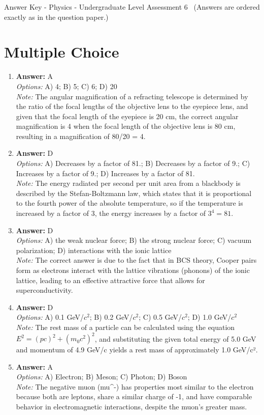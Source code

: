 \documentclass[12pt]{article}
\begin{document}
\begin{center}
Answer Key - Physics - Undergraduate Level Assessment 6 \
\small (Answers are ordered exactly as in the question paper.)
\end{center}

\section*{Multiple Choice}
\begin{enumerate}[label=\arabic*.]
\item \textbf{Answer:} A
\\ \textit{Options:} A) 4; B) 5; C) 6; D) 20
\\ \textit{Note:} The angular magnification of a refracting telescope is determined by the ratio of the focal lengths of the objective lens to the eyepiece lens, and given that the focal length of the eyepiece is 20 cm, the correct angular magnification is 4 when the focal length of the objective lens is 80 cm, resulting in a magnification of 80/20 = 4.
\item \textbf{Answer:} D
\\ \textit{Options:} A) Decreases by a factor of 81.; B) Decreases by a factor of 9.; C) Increases by a factor of 9.; D) Increases by a factor of 81.
\\ \textit{Note:} The energy radiated per second per unit area from a blackbody is described by the Stefan-Boltzmann law, which states that it is proportional to the fourth power of the absolute temperature, so if the temperature is increased by a factor of 3, the energy increases by a factor of \(3^4 = 81\).
\item \textbf{Answer:} D
\\ \textit{Options:} A) the weak nuclear force; B) the strong nuclear force; C) vacuum polarization; D) interactions with the ionic lattice
\\ \textit{Note:} The correct answer is due to the fact that in BCS theory, Cooper pairs form as electrons interact with the lattice vibrations (phonons) of the ionic lattice, leading to an effective attractive force that allows for superconductivity.
\item \textbf{Answer:} D
\\ \textit{Options:} A) 0.1 GeV/$c^2$; B) 0.2 GeV/$c^2$; C) 0.5 GeV/$c^2$; D) 1.0 GeV/$c^2$
\\ \textit{Note:} The rest mass of a particle can be calculated using the equation \(E^2 = (pc)^2 + (m_0 c^2)^2\), and substituting the given total energy of 5.0 GeV and momentum of 4.9 GeV/c yields a rest mass of approximately 1.0 GeV/c².
\item \textbf{Answer:} A
\\ \textit{Options:} A) Electron; B) Meson; C) Photon; D) Boson
\\ \textit{Note:} The negative muon (mu^-) has properties most similar to the electron because both are leptons, share a similar charge of -1, and have comparable behavior in electromagnetic interactions, despite the muon's greater mass.
\end{enumerate}
\end{document}
